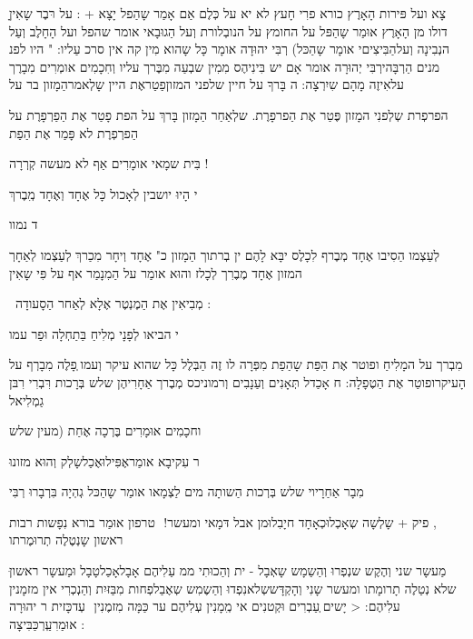 \documentclass[14pt, a5paper, twoside, extrafontsizes]{memoir}
\begin{document}
\begin{hebrew}
ָצָא \hdot
 ועל פּירות הָאָרֶץ כורא פרִי חָעץ לא
יא \hdot
 על כְּלֶם אַם אָמַר שָהַפל יָצָא + : על
רּבֶר שָאִין דולו מן הָאָרֶץ אוּמַר שָהַפּל \hdot
 על
החומץ על הנובְלורת וְעל הַגוּבָאי אומר
שהפל \hdot
ועל הָחָלֶב וְעַל הנְבִינָה וְעלהַבִּיצִיםי
אומָר שָהַכּל) רְבִּי יהוּדָה אומָר כָּל שָהוא מִין
קה אין סרכ עַליו: " היו לפנ מנים
הַרְבָּהירְבִּי יְהוּרָה אומר אָם יש בִּינִיהֶס מִמִין
שבְעַה מִבֶּרך עליו \hdot
 וְחִכָמִים אומְרִים מִבָרֶך
עלאִיזֶה מָהָם שִיִרְצָה: ה בָּרךָ על חיין שלפני
המזוןפַטַראֶת היין שָלְאמרהַמָזון בר על

הפרפְרת שְלְפנִי המָזון \hdot
 פֶּטַר אֶת הַפרפָרֶת.
שלְאַחַר הַמָזון \hdot
 בָּרךְ על הפת \hdot
 פָטַר אֶת
הַפַרְפָרֶת \hdot
 על הַפרְפְרֶת \hdot
 לא פָּמַר אֶת הַפַת \hdot

בִּית שמָאי אומָרִים אַף לא מעשה קְרְרָה !

%

י הָיוּ יושבין לְאָכול \hdot
 כָּל אֶחָד וְאֶחָד מְִבֶרךְ

ד נמוו

לְעַצְמו \hdot
 הַסִיבו אֶחָד מְבֶרף לִכָלֶס יבָּא לָהֶם
ין בְרתוך הַמָזון כ" אֶחָד וְיחָר מִכַרךְ
לְעַצְמו \hdot
 לְאַחָרְ המזון אֶחָד מֶבֶרִך לְכָלז
והוּא אומַר על הַמִנָמַר \hdot
 אף על פִּי שָאִין

\ מְבִיאִין אֶת הַמֶנְטֶר אֶלָא לְאַחר הַסָעודָה :

 

י הביאו לְפָנָי מְלִיחַ בַּתַחְלָה וּפַר עמו \hdot

מִבְרך על המָלִיחַ \hdot
 ופוטר אֶת הַפַּת \hdot
 שָהַפַת
מִפְּרָה לו \hdot
 זֶה הַבְּלֶל \hdot
 כָּל שהוא עיקר וְעמו
ְפָלֶה\hdot
 מִבָרְף על הָעיקרופוטַר אֶת הַטֶפָלָה:
ח אָכַדל תְּאָנִים וְעַנָבִים וְרמוניכס \hdot
 מְבֶרך
אַחָרִיהֶן שלש בְּרָכות רִּבְרִי רִבּן גַמְלִיאל \hdot

וחכָמִים אוּמָרִים בֶּרְכָה אֶחַת (מעין שלש \hdot

ר\hdot
 עִקיבָא אומַראֶפִּילוּאֶכַלשָלְק וְהוּא מזונוּ\hdot

מִבָר אַחַרָיוי שלש בְּרְכות \hdot
 הַשותָה מים
לַצְמָאו \hdot
 אומַר שָהַכּל גְהְיָה בִּרְבָרוּ \hdot
 רְבִּי

טרפון אוּמַר בורא נִפָשות רבות ‎ !‏ ,
פיק + שָלְשָה שְאָכְלוּכְאָחָד חיָבִלוּמן אבל
דּמָאי \hdot
 ומעשר ראשון שָנְטֶלֶה תְרוּמֶרתו \hdot

ּמַעשָר שני וְהֶקֶש שנְפְרוּ\hdot
 וְהַשַמָש שָאְבָל -
ית וְהַכוּתִי ממ עַלִיהֶם\hdot
אָבָלאָכַלטָבָל
וּמַעשָר ראשון שלא נְטַלֶה תָרומָתו \hdot
 ומעשר
שָנִי וְהָקְדָּששְלאנִפְדוּ וְהַשֶמִש שְאֶבַלפְחות
מִבַּזּיִת \hdot
 וְהַנְכְרִי \hdot
 אין מזמָנין עלִיהֶם: < יָשים
ְעַבְרִים וּקְטנִים אי מְִמָנִין עְלִיהֶם \hdot
 ער כַּמָּה
מִזמֶנִין ‏ עְדכָּזית \hdot
ר\hdot
 יהוּרָה אוּמַרִעְַרְכַּבִּיצָה :


\end{hebrew}
\end{document}
